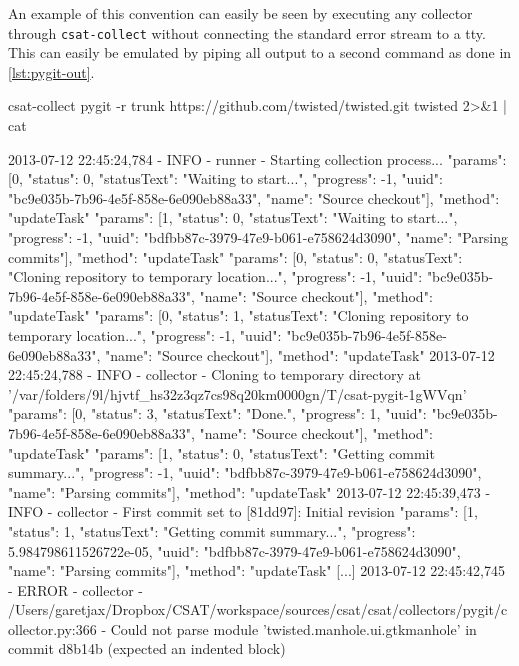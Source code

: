 An example of this convention can easily be seen by executing any collector through \texttt{csat-\BreakableSlash{}collect} without connecting the standard error stream to a \gls{tty}. This can easily be emulated by piping all output to a second command as done in \vref{lst:pygit-out}.

\begin{userprompt}[basicstyle=\scriptsize\bf\ttfamily,caption={Example output of the \texttt{pygit} collector when run without a \gls{tty}},label=lst:pygit-out]
csat-collect pygit -r trunk https://github.com/twisted/twisted.git twisted 2>&1 | cat
\end{userprompt}
\begin{cmdresult}[basicstyle=\tiny\ttfamily]
2013-07-12 22:45:24,784 - INFO - runner - Starting collection process...
{"params": [0, {"status": 0, "statusText": "Waiting to start...", "progress": -1, "uuid": "bc9e035b-7b96-4e5f-858e-6e090eb88a33", "name": "Source checkout"}], "method": "updateTask"}
{"params": [1, {"status": 0, "statusText": "Waiting to start...", "progress": -1, "uuid": "bdfbb87c-3979-47e9-b061-e758624d3090", "name": "Parsing commits"}], "method": "updateTask"}
{"params": [0, {"status": 0, "statusText": "Cloning repository to temporary location...", "progress": -1, "uuid": "bc9e035b-7b96-4e5f-858e-6e090eb88a33", "name": "Source checkout"}], "method": "updateTask"}
{"params": [0, {"status": 1, "statusText": "Cloning repository to temporary location...", "progress": -1, "uuid": "bc9e035b-7b96-4e5f-858e-6e090eb88a33", "name": "Source checkout"}], "method": "updateTask"}
2013-07-12 22:45:24,788 - INFO - collector - Cloning to temporary directory at '/var/folders/9l/hjvtf_hs32z3qz7cs98q20km0000gn/T/csat-pygit-1gWVqn'
{"params": [0, {"status": 3, "statusText": "Done.", "progress": 1, "uuid": "bc9e035b-7b96-4e5f-858e-6e090eb88a33", "name": "Source checkout"}], "method": "updateTask"}
{"params": [1, {"status": 0, "statusText": "Getting commit summary...", "progress": -1, "uuid": "bdfbb87c-3979-47e9-b061-e758624d3090", "name": "Parsing commits"}], "method": "updateTask"}
2013-07-12 22:45:39,473 - INFO - collector - First commit set to [81dd97]: Initial revision
{"params": [1, {"status": 1, "statusText": "Getting commit summary...", "progress": 5.984798611526722e-05, "uuid": "bdfbb87c-3979-47e9-b061-e758624d3090", "name": "Parsing commits"}], "method": "updateTask"}
[...]
2013-07-12 22:45:42,745 - ERROR - collector - /Users/garetjax/Dropbox/CSAT/workspace/sources/csat/csat/collectors/pygit/collector.py:366 - Could not parse module 'twisted.manhole.ui.gtkmanhole' in commit d8b14b (expected an indented block)

\end{cmdresult}

